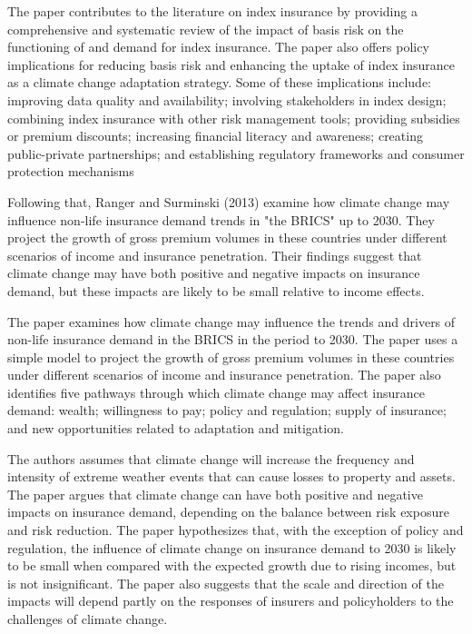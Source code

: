 \documentclass[a4paper,12pt]{article}
\begin{document}
The paper contributes to the literature on index insurance by providing a comprehensive and systematic review of the impact of basis risk on the functioning of and demand for index insurance. The paper also offers policy implications for reducing basis risk and enhancing the uptake of index insurance as a climate change adaptation strategy. Some of these implications include: improving data quality and availability; involving stakeholders in index design; combining index insurance with other risk management tools; providing subsidies or premium discounts; increasing financial literacy and awareness; creating public-private partnerships; and establishing regulatory frameworks and consumer protection mechanisms

Following that, Ranger and Surminski (2013) examine how climate change may influence non-life insurance demand trends in "the BRICS" up to 2030. They project the growth of gross premium volumes in these countries under different scenarios of income and insurance penetration. Their findings suggest that climate change may have both positive and negative impacts on insurance demand, but these impacts are likely to be small relative to income effects.

The paper examines how climate change may influence the trends and drivers of non-life insurance demand in the BRICS in the period to 2030. The paper uses a simple model to project the growth of gross premium volumes in these countries under different scenarios of income and insurance penetration. The paper also identifies five pathways through which climate change may affect insurance demand: wealth; willingness to pay; policy and regulation; supply of insurance; and new opportunities related to adaptation and mitigation.

The authors assumes that climate change will increase the frequency and intensity of extreme weather events that can cause losses to property and assets. The paper argues that climate change can have both positive and negative impacts on insurance demand, depending on the balance between risk exposure and risk reduction. The paper hypothesizes that, with the exception of policy and regulation, the influence of climate change on insurance demand to 2030 is likely to be small when compared with the expected growth due to rising incomes, but is not insignificant. The paper also suggests that the scale and direction of the impacts will depend partly on the responses of insurers and policyholders to the challenges of climate change.
\end{document}
